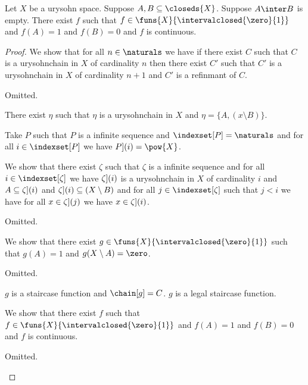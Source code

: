 \begin{theorem}\label{urysohn}
    Let $X$ be a urysohn space.
    Suppose $A,B \subseteq \closeds{X}$.
    Suppose $A \inter B$ is empty.
    There exist $f$ such that $f \in \funs{X}{\intervalclosed{\zero}{1}}$ 
    and $f(A) = 1$ and $f(B)= 0$ and $f$ is continuous.
\end{theorem}
\begin{proof}
    We show that for all $n \in \naturals$ we have
    if there exist $C$ such that $C$ is a urysohnchain in $X$ of cardinality $n$ 
    then there exist $C'$  such that $C'$ is a urysohnchain in $X$ of cardinality $n+1$ 
    and $C'$ is a refinmant of $C$.
    \begin{subproof}
        Omitted.
    \end{subproof}

    There exist $\eta$ such that $\eta$ is a urysohnchain in $X$ and $\eta =\{A, (x \setminus B)\}$.

    

    Take $P$ such that $P$ is a infinite sequence and $\indexset[P] = \naturals$ and for all $i \in \indexset[P]$ we have $\index[P](i) = \pow{X}$.
    
    We show that there exist $\zeta$ such that $\zeta$ is a infinite sequence 
    and for all $i \in \indexset[\zeta]$ we have 
    $\index[\zeta](i)$ is a urysohnchain in $X$ of cardinality $i$
    and $A \subseteq \index[\zeta](i)$
    and $\index[\zeta](i) \subseteq (X \setminus B)$
    and for all $j \in \indexset[\zeta]$ such that 
    $j < i$ we have for all $x \in \index[\zeta](j)$ we have $x \in \index[\zeta](i)$.
    \begin{subproof}
        Omitted.
    \end{subproof}
  
    


    



    We show that there exist $g \in \funs{X}{\intervalclosed{\zero}{1}}$ such that $g(A)=1$ and $g(X\setminus A) = \zero$.
    \begin{subproof}
        Omitted.
    \end{subproof}
    $g$ is a staircase function and $\chain[g] = C$.
    $g$ is a legal staircase function.


    We show that there exist $f$ such that $f \in \funs{X}{\intervalclosed{\zero}{1}}$ 
    and $f(A) = 1$ and $f(B)= 0$ and $f$ is continuous.
    \begin{subproof}
        Omitted.
    \end{subproof}



\end{proof}
